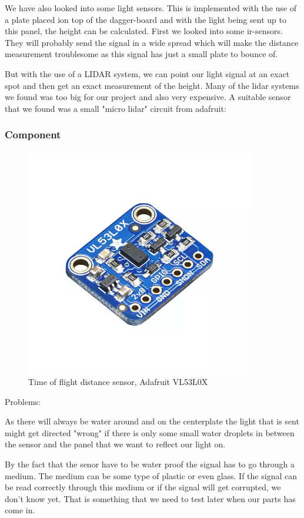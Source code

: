 We have also looked into some light sensors. This is implemented with the use of a plate placed ion top of the dagger-board and with the light being sent up to this panel, the height can be calculated. First we looked into some ir-sensors. They will probably send the signal in a wide spread which will make the distance measurement troublesome as this signal has just a small plate to bounce of.  
  

But with the use of a LIDAR system, we can point our light signal at an exact spot and then get an exact measurement of the height.  
Many of the lidar systems we found was too big for our project and also very expensive.  
A suitable sensor that we found was a small "micro lidar" circuit from adafruit: 




\subsubsection{Component}



 \begin{figure}[H]
\begin{center}
	\includegraphics[width = 10cm]{Figures/Adafruit_height_sensor.png}
	\caption{Time of flight distance sensor, Adafruit VL53L0X}
	\label{micro_lidar}
\end{center}
\end{figure}
Problems: 

As there will always be water around and on the centerplate the light that is sent might get directed "wrong" if there is only some small water droplets in between the sensor and the panel that we want to reflect our light on. 

By the fact that the senor have to be water proof the signal has to go through a medium. The medium can be some type of plastic or even glass.  
If the signal can be read correctly through this medium or if the signal will get corrupted, we don't know yet. That is something that we need to test later when our parts has come in. 



